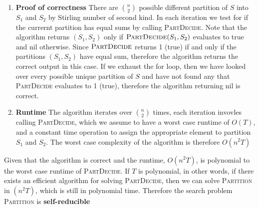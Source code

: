 \documentclass[11pt]{article}
\begin{document}
\begin{enumerate}
\begin{solution}
\begin{algorithm}[H]
{            }
        \end{algorithm}
        \begin{enumerate}
            \item \textbf{Proof of correctness} There are $\binom{n}{2}$ possible different partition of $S$ into $S_1$ and $S_2$ by Stirling number of second kind. In each iteration we test for if the currernt partition has equal sums by calling \textsc{PartDecide}. Note that the algorithm returns $(S_1, S_2)$ only if $\textsc{PartDecide}(S_1,S_2)$ evaluates to true and nil otherwise. Since $\textsc{PartDecide}$ returns 1 (true) if and only if the partitions $(S_1, S_2)$ have equal sum, therefore the algorithm returns the correct output in this case. If we exhaust the for loop, then we have looked over every possible unique partition of $S$ and have not found any that \textsc{PartDecide} evaluates to 1 (true), therefore the algorithm returning nil is correct.
            \item \textbf{Runtime} The algorithm iterates over $\binom{n}{2}$ times, each iteration invovles calling \textsc{PartDecide}, which we assume to have a worst case runtime of $O(T)$, and a constant time operation to assign the appropriate element to partition $S_1$ and $S_2$. The worst case complexity of the algorithm is therefore $O(n^2 T)$
        \end{enumerate}
        Given that the algorithm is correct and the runtime, $O(n^2 T)$, is polynomial to the worst case runtime of \textsc{PartDecide}. If $T$ is polynomial, in other words, if there exists an efficient algorithm for solving \textsc{PartDecide}, then we can solve \textsc{Partition} in $(n^2 T)$, which is still in polynomial time. Therefore the search problem \textsc{Partition} is \textbf{self-reducible} 
    \end{solution}
\end{enumerate}
\end{document}
